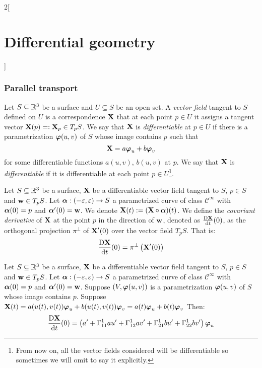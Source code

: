 \documentclass[../../../main.tex]{subfiles}
\begin{document}
\begin{multicols}{2}[\section{Differential geometry}]
  \subsubsection{Parallel transport}
  \begin{definition}
    Let $S\subseteq\mathbb{R}^3$ be a surface and $U\subseteq S$ be an open set. A \emph{vector field} tangent to $S$ defined on $U$ is a correspondence $\boldsymbol{\mathrm{X}}$ that at each point $p\in U$ it assigns a tangent vector $\boldsymbol{\mathrm{X}}(p)=:\boldsymbol{\mathrm{X}}_p\in T_pS$. We say that $\boldsymbol{\mathrm{X}}$ is \emph{differentiable} at $p\in U$ if there is a parametrization $\boldsymbol{\mathrm{\varphi}}(u,v)$ of $S$ whose image contains $p$ such that $$\boldsymbol{\mathrm{X}}=a\boldsymbol{\mathrm{\varphi}}_u+b\boldsymbol{\mathrm{\varphi}}_v$$ for some differentiable functions $a(u,v)$, $b(u,v)$ at $p$. We say that $\boldsymbol{\mathrm{X}}$ is \emph{differentiable} if it is differentiable at each point $p\in U$\footnote{From now on, all the vector fields considered will be differentiable so sometimes we will omit to say it explicitly.}.
  \end{definition}
  \begin{definition}
    Let $S\subseteq\mathbb{R}^3$ be a surface, $\boldsymbol{\mathrm{X}}$ be a differentiable vector field tangent to $S$, $p\in S$ and $\boldsymbol{\mathrm{w}}\in T_pS$. Let $\boldsymbol{\mathrm{\alpha}}:(-\varepsilon,\varepsilon)\rightarrow S$ a parametrized curve of class $\mathcal{C}^\infty$ with $\boldsymbol{\mathrm{\alpha}}(0)=p$ and $\boldsymbol{\mathrm{\alpha}}'(0)=\boldsymbol{\mathrm{w}}$. We denote $\boldsymbol{\mathrm{X}}(t):=(\boldsymbol{\mathrm{X}}\circ\boldsymbol{\mathrm{\alpha}})(t)$. We define the \emph{covariant derivative} of $\boldsymbol{\mathrm{X}}$ at the point $p$ in the direction of $\boldsymbol{\mathrm{w}}$, denoted as $\frac{\text{D}\boldsymbol{\mathrm{X}}}{\dd{t}}(0)$, as the orthogonal projection $\pi^\perp$ of $\boldsymbol{\mathrm{X}}'(0)$ over the vector field $T_pS$. That is: $$\frac{\text{D}\boldsymbol{\mathrm{X}}}{\dd{t}}(0)=\pi^\perp\left(\boldsymbol{\mathrm{X}}'(0)\right)$$
  \end{definition}
  \begin{proposition}
    Let $S\subseteq\mathbb{R}^3$ be a surface, $\boldsymbol{\mathrm{X}}$ be a differentiable vector field tangent to $S$, $p\in S$ and $\boldsymbol{\mathrm{w}}\in T_pS$. Let $\boldsymbol{\mathrm{\alpha}}:(-\varepsilon,\varepsilon)\rightarrow S$ a parametrized curve of class $\mathcal{C}^\infty$ with $\boldsymbol{\mathrm{\alpha}}(0)=p$ and $\boldsymbol{\mathrm{\alpha}}'(0)=\boldsymbol{\mathrm{w}}$. Suppose $(V,\boldsymbol{\mathrm{\varphi}}(u,v))$ is a parametrization $\boldsymbol{\mathrm{\varphi}}(u,v)$ of $S$ whose image contains $p$. Suppose $\boldsymbol{\mathrm{X}}(t)=a(u(t),v(t))\boldsymbol{\mathrm{\varphi}}_u+b(u(t),v(t))\boldsymbol{\mathrm{\varphi}}_v=a(t)\boldsymbol{\mathrm{\varphi}}_u+b(t)\boldsymbol{\mathrm{\varphi}}_v$ Then:
    \begin{multline}\label{DG_covderivative}
      \frac{\text{D}\vf{X}}{\dd{t}}(0)=\left(a'+\Gamma_{11}^1au'+\Gamma_{12}^1av'+\Gamma_{21}^1bu'+\Gamma_{22}^1bv'\right)\vf\varphi_u\\

\end{multline}
\end{proposition}
\end{multicols}
\end{document}
